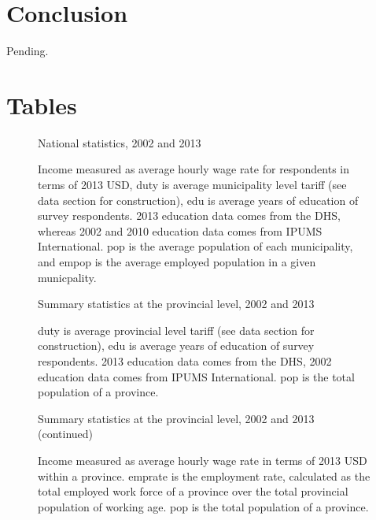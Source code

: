 \documentclass[12pt]{article}
\begin{document}
\vspace{-10pt}
\section{Conclusion}
\label{sec:Conclusion}
Pending.

\newpage
\singlespacing



\newpage
\appendix
\singlespacing

\section{Tables}
\label{sec:Tables}
\fontsize{10pt}{12pt}\selectfont

\begin{figure}[H]
\begin{center}
National statistics, 2002 and 2013

\caption{\label{fig:Summary 1}}
\end{center}
Income measured
as average hourly wage rate for respondents in terms of 2013 USD, 
duty is average municipality level tariff (see data
section for construction), edu is average years of education of survey respondents. 
2013 education data comes from the DHS, whereas 2002 and 2010 education data comes
from IPUMS International. pop is the average population of each municipality,
and empop is the average employed population in a given municpality.
\end{figure}

\begin{figure}[H]
\begin{center}
Summary statistics at the provincial level, 2002 and 2013

\caption{\label{fig:Summary 2}}
\end{center}
duty is average provincial level tariff (see data
section for construction), edu is average years of education of survey respondents. 
2013 education data comes from the DHS, 2002 education data comes
from IPUMS International. pop is the total population of a province.
\end{figure}

\begin{figure}[H]
\begin{center}
Summary statistics at the provincial level, 2002 and 2013 (continued)

\caption{\label{fig:Summary 3}}
\end{center}
Income measured
as average hourly wage rate in terms of 2013 USD within a province.
emprate is the employment rate, calculated as the total employed work force of a province
over the total provincial population of working age.
pop is the total population of a province.
\end{figure}
\end{document}
